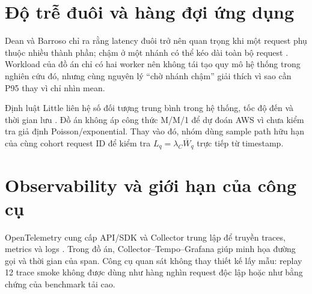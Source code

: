 \section{Độ trễ đuôi và hàng đợi ứng dụng}

Dean và Barroso chỉ ra rằng latency đuôi trở nên quan trọng khi một request
phụ thuộc nhiều thành phần; chậm ở một nhánh có thể kéo dài toàn bộ request
\cite{tail-at-scale}. Workload của đồ án chỉ có hai worker nên không tái tạo
quy mô hệ thống trong nghiên cứu đó, nhưng cùng nguyên lý ``chờ nhánh chậm''
giải thích vì sao cần P95 thay vì chỉ nhìn mean.

Định luật Little liên hệ số đối tượng trung bình trong hệ thống, tốc độ đến và
thời gian lưu \cite{little-proof,sigman-little}. Đồ án không áp công thức
M/M/1 để dự đoán AWS vì chưa kiểm tra giả định Poisson/exponential. Thay vào đó,
nhóm dùng sample path hữu hạn của cùng cohort request ID để kiểm tra
$L_q=\lambda_C\overline W_q$ trực tiếp từ timestamp.

\section{Observability và giới hạn của công cụ}

OpenTelemetry cung cấp API/SDK và Collector trung lập để truyền traces,
metrics và logs \cite{otel-docs}. Trong đồ án, Collector--Tempo--Grafana giúp
minh họa đường gọi và thời gian của span. Công cụ quan sát không thay thiết kế
lấy mẫu: replay 12 trace smoke không được dùng như hàng nghìn request độc lập
hoặc như bằng chứng của benchmark tải cao.
